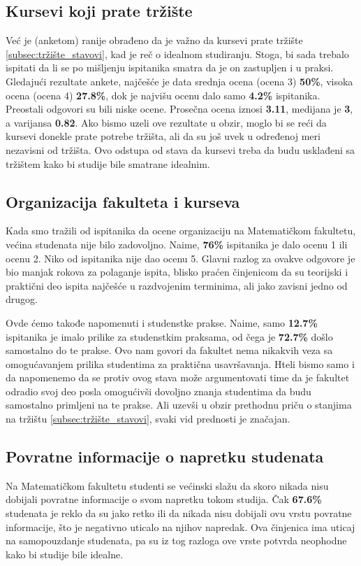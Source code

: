 \documentclass[a4paper]{article}
\begin{document}
{\subsection{Kursevi koji prate tržište}
\label{subsec:tržište_iskustva}

Već je (anketom) ranije obrađeno da je važno da kursevi prate tržište \ref{subsec:tržište_stavovi}, kad je reč o idealnom studiranju. Stoga, bi sada trebalo ispitati da li se po mišljenju ispitanika smatra da je on zastupljen i u praksi. Gledajući rezultate ankete, najčešće je data srednja ocena (ocena 3) \textbf{50\%}, visoka ocena (ocena 4) \textbf{27.8\%}, dok je najvišu ocenu dalo samo \textbf{4.2\%} ispitanika. Preostali odgovori su bili niske ocene. Prosečna ocena iznosi \textbf{3.11}, medijana je \textbf{3}, a varijansa \textbf{0.82}. Ako bismo uzeli ove rezultate u obzir, moglo bi se reći da kursevi donekle prate potrebe tržišta, ali da su još uvek u određenoj meri nezavisni od tržišta. Ovo odstupa od stava da kursevi treba da budu usklađeni sa tržištem kako bi studije bile smatrane idealnim.

\subsection{Organizacija fakulteta i kurseva}
\label{subsec:organizacija_iskustva}

Kada smo tražili od ispitanika da ocene organizaciju na Matematičkom fakultetu, većina studenata nije bilo zadovoljno. Naime, \textbf{76\%} ispitanika je dalo ocenu 1 ili ocenu 2. Niko od ispitanika nije dao ocenu 5. Glavni razlog za ovakve odgovore je bio manjak rokova za polaganje ispita, blisko praćen činjenicom da su teorijski i praktični deo ispita najčešće u razdvojenim terminima, ali jako zavisni jedno od drugog.

Ovde ćemo takođe napomenuti i studenstke prakse. Naime, samo \textbf{12.7\%} ispitanika je imalo prilike za studenstkim praksama, od čega je \textbf{72.7\%} došlo samostalno do te prakse. Ovo nam govori da fakultet nema nikakvih veza sa omogućavanjem prilika studentima za praktična usavršavanja. Hteli bismo samo i da napomenemo da se protiv ovog stava može argumentovati time da je fakultet odradio svoj deo posla omogućivši dovoljno znanja studentima da budu samostalno primljeni na te prakse. Ali uzevši u obzir prethodnu priču o stanjima na tržištu \ref{subsec:tržište_stavovi}, svaki vid prednosti je značajan.

\subsection{Povratne informacije o napretku studenata}
\label{subsec:napredak_iskustva}
Na Matematičkom fakultetu studenti se većinski slažu da skoro nikada nisu dobijali povratne informacije o svom napretku tokom studija. Čak \textbf{67.6\%} studenata je reklo da su jako retko ili da nikada nisu dobijali ovu vrstu povratne informacije, što je negativno uticalo na njihov napredak. Ova činjenica ima uticaj na samopouzdanje studenata, pa su iz tog razloga ove vrste potvrda neophodne kako bi studije bile idealne.

}
\end{document}
